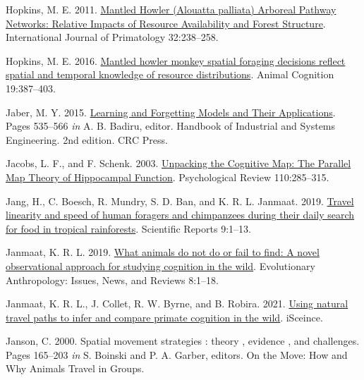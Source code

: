 \documentclass[twoside,12pt,final]{ucthesis-CA2012}
\newenvironment{CSLReferences}%
  {}%
  {\par}
\begin{document}
\begin{ucmainmatter}
\begin{CSLReferences}{1}{0}
\leavevmode{}%
Hopkins, M. E. 2011. \href{https://doi.org/10.1007/s10764-010-9464-9}{Mantled Howler (Alouatta palliata) Arboreal Pathway Networks: Relative Impacts of Resource Availability and Forest Structure}. International Journal of Primatology 32:238--258.

\leavevmode{}%
Hopkins, M. E. 2016. \href{https://doi.org/10.1007/s10071-015-0941-6}{Mantled howler monkey spatial foraging decisions reflect spatial and temporal knowledge of resource distributions}. Animal Cognition 19:387--403.

\leavevmode{}%
Jaber, M. Y. 2015. \href{https://doi.org/10.1201/9781420038347.ch30}{Learning and Forgetting Models and Their Applications}. Pages 535--566 \emph{in} A. B. Badiru, editor. Handbook of Industrial and Systems Engineering. 2nd edition. CRC Press.

\leavevmode{}%
Jacobs, L. F., and F. Schenk. 2003. \href{https://doi.org/10.1037/0033-295X.110.2.285}{Unpacking the Cognitive Map: The Parallel Map Theory of Hippocampal Function}. Psychological Review 110:285--315.

\leavevmode{}%
Jang, H., C. Boesch, R. Mundry, S. D. Ban, and K. R. L. Janmaat. 2019. \href{https://doi.org/10.1038/s41598-019-47247-9}{Travel linearity and speed of human foragers and chimpanzees during their daily search for food in tropical rainforests}. Scientific Reports 9:1--13.

\leavevmode{}%
Janmaat, K. R. L. 2019. \href{https://doi.org/10.1002/evan.21794}{What animals do not do or fail to find: A novel observational approach for studying cognition in the wild}. Evolutionary Anthropology: Issues, News, and Reviews 8:1--18.

\leavevmode{}%
Janmaat, K. R. L., J. Collet, R. W. Byrne, and B. Robira. 2021. \href{https://doi.org/10.1016/j.isci.2021.102343}{Using natural travel paths to infer and compare primate cognition in the wild}. iSceince.

\leavevmode{}%
Janson, C. 2000. Spatial movement strategies : theory , evidence , and challenges. Pages 165--203 \emph{in} S. Boinski and P. A. Garber, editors. On the Move: How and Why Animals Travel in Groups.


\end{CSLReferences}
\end{ucmainmatter}
\end{document}
